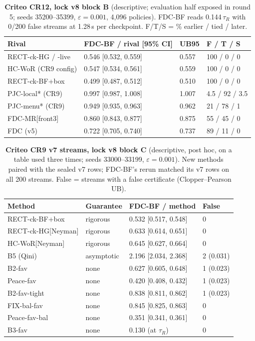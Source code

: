 \documentclass[sigconf,anonymous,review]{acmart}
\newcommand{\eps}{\varepsilon}
\begin{document}
\begin{table}[H]
\caption{\textbf{Criteo CR12, lock v8 block B} (descriptive; evaluation half exposed in round 5; seeds 35200--35399, $\eps = 0.001$, 4,096 policies). FDC-BF reads 0.144\,$\tau_R$ with 0/200 false streams at 1.28\,s per checkpoint. F/T/S = \% earlier / tied / later.}
\label{tab:cr12}
\footnotesize
\setlength{\tabcolsep}{3pt}
\begin{tabular}{@{}llll@{}}
\toprule
Rival & FDC-BF / rival [95\% CI] & UB95 & F / T / S \\
\midrule
RECT-ck-HG / -live & 0.546 [0.532, 0.559] & 0.557 & 100 / 0 / 0 \\
HC-WoR (CR9 config) & 0.547 [0.534, 0.561] & 0.559 & 100 / 0 / 0 \\
RECT-ck-BF+box & 0.499 [0.487, 0.512] & 0.510 & 100 / 0 / 0 \\
PJC-local* (CR9) & 0.997 [0.987, 1.008] & 1.007 & 4.5 / 92 / 3.5 \\
PJC-menu* (CR9) & 0.949 [0.935, 0.963] & 0.962 & 21 / 78 / 1 \\
FDC-MR[front3] & 0.860 [0.843, 0.877] & 0.875 & 55 / 45 / 0 \\
FDC (v5) & 0.722 [0.705, 0.740] & 0.737 & 89 / 11 / 0 \\
\bottomrule
\end{tabular}
\end{table}

\begin{table}[H]
\caption{\textbf{Criteo CR9 v7 streams, lock v8 block C} (descriptive, post hoc, on a table used three times; seeds 33000--33199, $\eps = 0.001$). New methods paired with the sealed v7 rows; FDC-BF's rerun matched its v7 rows on all 200 streams. False = streams with a false certificate (Clopper--Pearson UB).}
\label{tab:blockc}
\footnotesize
\setlength{\tabcolsep}{3pt}
\begin{tabular}{@{}llll@{}}
\toprule
Method & Guarantee & FDC-BF / method & False \\
\midrule
RECT-ck-BF+box & rigorous & 0.532 [0.517, 0.548] & 0 \\
RECT-ck-HG[Neyman] & rigorous & 0.633 [0.614, 0.651] & 0 \\
HC-WoR[Neyman] & rigorous & 0.645 [0.627, 0.664] & 0 \\
B5 (Qini) & asymptotic & 2.196 [2.034, 2.368] & 2 (0.031) \\
B2-fav & none & 0.627 [0.605, 0.648] & 1 (0.023) \\
Peace-fav & none & 0.420 [0.408, 0.432] & 1 (0.023) \\
B2-fav-tight & none & 0.838 [0.811, 0.862] & 1 (0.023) \\
FIX-bal-fav & none & 0.845 [0.825, 0.863] & 0 \\
Peace-fav-bal & none & 0.351 [0.341, 0.361] & 0 \\
B3-fav & none & 0.130 (at $\tau_R$) & 0 \\
\bottomrule
\end{tabular}
\end{table}
\end{document}
